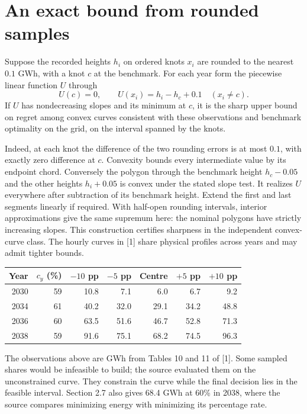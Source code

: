 \documentclass[11pt]{article}
\begin{document}
\section{An exact bound from rounded samples}
Suppose the recorded heights $h_i$ on ordered knots $x_i$ are rounded to the nearest $0.1$ GWh, with a knot $c$ at the benchmark. For each year form the piecewise linear function $U$ through
\[
 U(c)=0,\qquad U(x_i)=h_i-h_c+0.1\quad(x_i\ne c).
\]
If $U$ has nondecreasing slopes and its minimum at $c$, it is the sharp upper bound on regret among convex curves consistent with these observations and benchmark optimality on the grid, on the interval spanned by the knots.

Indeed, at each knot the difference of the two rounding errors is at most $0.1$, with exactly zero difference at $c$. Convexity bounds every intermediate value by its endpoint chord. Conversely the polygon through the benchmark height $h_c-0.05$ and the other heights $h_i+0.05$ is convex under the stated slope test. It realizes $U$ everywhere after subtraction of its benchmark height. Extend the first and last segments linearly if required. With half-open rounding intervals, interior approximations give the same supremum here: the nominal polygons have strictly increasing slopes. This construction certifies sharpness in the independent convex-curve class. The hourly curves in [1] share physical profiles across years and may admit tighter bounds.

\begin{center}\small
\begin{tabular}{rrrrrrr}
\toprule
Year & $c_y$ (\%) & $-10$ pp & $-5$ pp & Centre & $+5$ pp & $+10$ pp\\\midrule
2030&59&10.8&7.1&6.0&6.7&9.2\\
2034&61&40.2&32.0&29.1&34.2&48.8\\
2036&60&63.5&51.6&46.7&52.8&71.3\\
2038&59&91.6&75.1&68.2&74.5&96.3\\\bottomrule
\end{tabular}
\end{center}
The observations above are GWh from Tables 10 and 11 of [1]. Some sampled shares would be infeasible to build; the source evaluated them on the unconstrained curve. They constrain the curve while the final decision lies in the feasible interval. Section 2.7 also gives 68.4 GWh at 60\% in 2038, where the source compares minimizing energy with minimizing its percentage rate.
\end{document}
